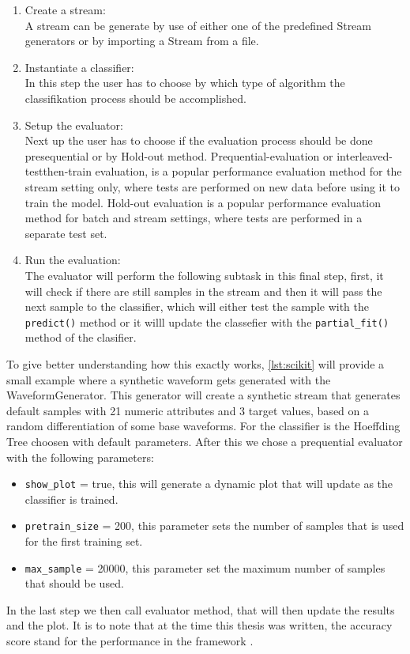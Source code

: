 \documentclass[12pt,oneside,a4paper,parskip]{scrbook}
\begin{document}
\begin{enumerate}
  \item Create a stream: \\
        A stream can be generate by use of either one of the predefined Stream generators or by importing a Stream from a file.
  \item Instantiate a classifier: \\
        In this step the user has to choose by which type of algorithm the classifikation process should be accomplished.
  \item Setup the evaluator: \\
        Next up the user has to choose if the evaluation process should be done presequential or by Hold-out method.
        Prequential-evaluation or interleaved-testthen-train evaluation, is a popular performance 
        evaluation method for the stream setting only, where tests are performed on new data before using it to train the model.
        Hold-out evaluation is a popular performance evaluation method for batch and stream settings, where tests are performed 
        in a separate test set. \cite{skmultiflow}
  \item Run the evaluation: \\
        The evaluator will perform the following subtask in this final step,
        first, it will check if there are still samples in the stream and then it will pass the next sample to the classifier,
        which will either test the sample with the \verb|predict()| method or it willl update the classefier with the \verb|partial_fit()|
        method of the clasifier.
\end{enumerate}
  
To give better understanding how this exactly works, \ref{lst:scikit} will provide a small example where a synthetic waveform gets 
generated with the WaveformGenerator. This generator will create a synthetic stream that generates default samples with
21 numeric attributes and 3 target values, based on a random differentiation of some base waveforms.
For the classifier is the Hoeffding Tree choosen with default parameters.
After this we chose a prequential evaluator with the following parameters: 
\begin{itemize}
  \item \verb|show_plot| = true, this will generate a dynamic plot that will update as the classifier is trained.
  \item \verb|pretrain_size| = 200, this parameter sets the number of samples that is used for the first training set.
  \item \verb|max_sample| = 20000, this parameter set the maximum number of samples that should be used.
\end{itemize}
In the last step we then call evaluator method, that will then update the results and the plot.
It is to note that at the time this thesis was written, the accuracy score stand for the performance 
in the framework \cite{skmultiflow}. 
\end{document}
